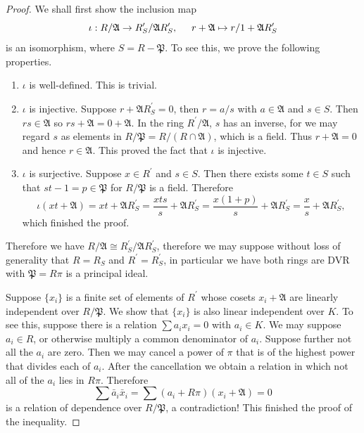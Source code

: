\begin{proof}
We shall first show the inclusion map 
$$
\iota :R/\mathfrak{A} \rightarrow R_{S}^{\prime}/\mathfrak{A} R_{S}^{\prime},\hspace{0.5cm}r+\mathfrak{A} \mapsto r/1+\mathfrak{A} R_{S}^{\prime}
$$
is an isomorphism, where $S=R-\mathfrak{P}$. To see this, we prove the following properties.
\begin{enumerate}
    \item $\iota$ is well-defined. This is trivial.
    \item $\iota$ is injective. Suppose $r+\mathfrak{A}R_S^\prime=0$, then $r=a/s$ with $a\in\mathfrak{A}$ and $s\in S$. Then $rs\in\mathfrak{A}$ so $rs+\mathfrak{A}=0+\mathfrak{A}$. In the ring $R^\prime/\mathfrak{A}$, $s$ has an inverse, for we may regard $s$ as elements in $R/\mathfrak{P}=R/(R\cap\mathfrak{A})$, which is a field. Thus $r+\mathfrak{A}=0$ and hence $r\in\mathfrak{A}$. This proved the fact that $\iota$ is injective.
    \item $\iota$ is surjective. Suppose $x\in R^\prime$ and $s\in S$. Then there exists some $t\in S$ such that $st-1=p\in\mathfrak{P}$ for $R/\mathfrak{P}$ is a field. Therefore 
    $$
    \iota \left( xt+\mathfrak{A} \right) =xt+\mathfrak{A} R_{S}^{\prime}=\frac{xts}{s}+\mathfrak{A} R_{S}^{\prime}=\frac{x\left( 1+p \right)}{s}+\mathfrak{A} R_{S}^{\prime}=\frac{x}{s}+\mathfrak{A} R_{S}^{\prime},
    $$
    which finished the proof.
\end{enumerate}
Therefore we have $R/\mathfrak{A} \cong R_{S}^{\prime}/\mathfrak{A} R_{S}^{\prime}$, therefore we may suppose without loss of generality that $R=R_S$ and $R^\prime=R_S^\prime$, in particular we have both rings are DVR with $\mathfrak{P}=R\pi$ is a principal ideal.\par
Suppose $\{x_i\}$ is a finite set of elements of $R^\prime$ whose cosets $x_i+\mathfrak{A}$ are linearly independent over $R/\mathfrak{P}$. We show that $\{x_i\}$ is also linear independent over $K$. To see this, suppose there is a relation $\sum a_ix_i=0$ with $a_i\in K$. We may suppose $a_i\in R$, or otherwise multiply a common denominator of $a_i$. Suppose further not all the $a_i$ are zero. Then we may cancel a power of $\pi$ that is of the highest power that divides each of $a_i$. After the cancellation we obtain a relation in which not all of the $a_i$ lies in $R\pi$. Therefore 
$$
\sum{\bar{a}_i\bar{x}_i}=\sum{\left( a_i+R\pi \right) \left( x_i+\mathfrak{A} \right)}=0
$$
is a relation of dependence over $R/\mathfrak{P}$, a contradiction! This finished the proof of the inequality.
\end{proof}
